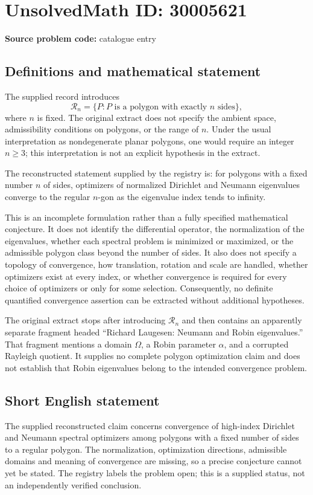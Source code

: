 \documentclass[11pt]{article}
\begin{document}
\section*{UnsolvedMath ID: 30005621}
\textbf{Source problem code:} catalogue entry
\subsection{Definitions and mathematical statement}
The supplied record introduces
\[
\mathcal R_n=\{P:P\text{ is a polygon with exactly }n\text{ sides}\},
\]
where \(n\) is fixed. The original extract does not specify the ambient space, admissibility conditions on polygons, or the range of \(n\). Under the usual interpretation as nondegenerate planar polygons, one would require an integer \(n\geq 3\); this interpretation is not an explicit hypothesis in the extract.

The reconstructed statement supplied by the registry is: for polygons with a fixed number \(n\) of sides, optimizers of normalized Dirichlet and Neumann eigenvalues converge to the regular \(n\)-gon as the eigenvalue index tends to infinity.

This is an incomplete formulation rather than a fully specified mathematical conjecture. It does not identify the differential operator, the normalization of the eigenvalues, whether each spectral problem is minimized or maximized, or the admissible polygon class beyond the number of sides. It also does not specify a topology of convergence, how translation, rotation and scale are handled, whether optimizers exist at every index, or whether convergence is required for every choice of optimizers or only for some selection. Consequently, no definite quantified convergence assertion can be extracted without additional hypotheses.

The original extract stops after introducing \(\mathcal R_n\) and then contains an apparently separate fragment headed ``Richard Laugesen: Neumann and Robin eigenvalues.'' That fragment mentions a domain \(\Omega\), a Robin parameter \(\alpha\), and a corrupted Rayleigh quotient. It supplies no complete polygon optimization claim and does not establish that Robin eigenvalues belong to the intended convergence problem.
\subsection{Short English statement}
The supplied reconstructed claim concerns convergence of high-index Dirichlet and Neumann spectral optimizers among polygons with a fixed number of sides to a regular polygon. The normalization, optimization directions, admissible domains and meaning of convergence are missing, so a precise conjecture cannot yet be stated. The registry labels the problem open; this is a supplied status, not an independently verified conclusion.
\end{document}
